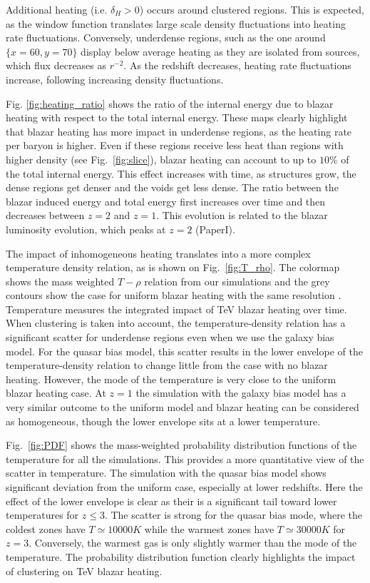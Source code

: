 \documentclass[twocolumns]{emulateapj}
\begin{document}
Additional heating (i.e. $\delta_H>0$) occurs around clustered regions. This is expected, as the window function translates large scale density fluctuations into heating rate fluctuations.  Conversely, underdense regions, such as the one around $\{x=60,y=70\}$ display below average heating as they are isolated from sources, which flux decreases as $r^{-2}$. As the redshift decreases, heating rate fluctuations increase, following increasing density fluctuations.

Fig. \ref{fig:heating_ratio} shows the ratio of the internal energy due to  blazar heating with respect to the total internal energy.  These maps clearly highlight that blazar heating has more impact in underdense regions, as the heating rate per baryon is higher. Even if these regions receive less heat than regions with higher density (see Fig.~\ref{fig:slice}), blazar heating can account to up to $10\%$ of the total internal energy.  This effect increases with time, as structures grow, the dense regions get denser and the voids get less dense. The ratio between the blazar induced energy and total energy first increases over time and then decreases between $z=2$ and $z=1$.  This evolution is related to the blazar luminosity evolution, which peaks at $z=2$ (PaperI).


The impact of inhomogeneous heating translates into a more complex temperature density relation, as is shown on Fig.~\ref{fig:T_rho}. The colormap shows the mass weighted $T-\rho$ relation from our simulations and the grey contours show the case for uniform blazar heating  with the same resolution \citep{2012MNRAS.423..149P}.  Temperature measures the integrated impact of TeV blazar heating over time. When clustering is taken into account, the temperature-density relation has a significant scatter for underdense regions even when we use the galaxy bias model. For the quasar bias model, this scatter results in the lower envelope of the temperature-density relation to change little from the case with no blazar heating.  However, the mode of the temperature is very close to the uniform blazar heating case. At $z=1$ the simulation with the galaxy bias model has a very similar outcome to the uniform model and  blazar heating can be considered as homogeneous, though the lower envelope sits at a lower temperature.

Fig.~\ref{fig:PDF} shows the mass-weighted probability distribution functions of the temperature for all the simulations. This provides a more quantitative view of the scatter in temperature.  The simulation with the quasar bias model shows significant deviation from the uniform case, especially at lower redshifts. Here the effect of the lower envelope is clear as their is a significant tail toward lower temperatures for $z \leqslant 3$. The scatter is strong for the quasar bias mode, where the coldest zones have $T\simeq 10 000K$ while the warmest zones have $T\simeq 30 000K$ for $z=3$. Conversely, the warmest gas is only slightly warmer than the mode of the temperature. The probability distribution function clearly highlights the impact of clustering on TeV blazar heating.
\end{document}
